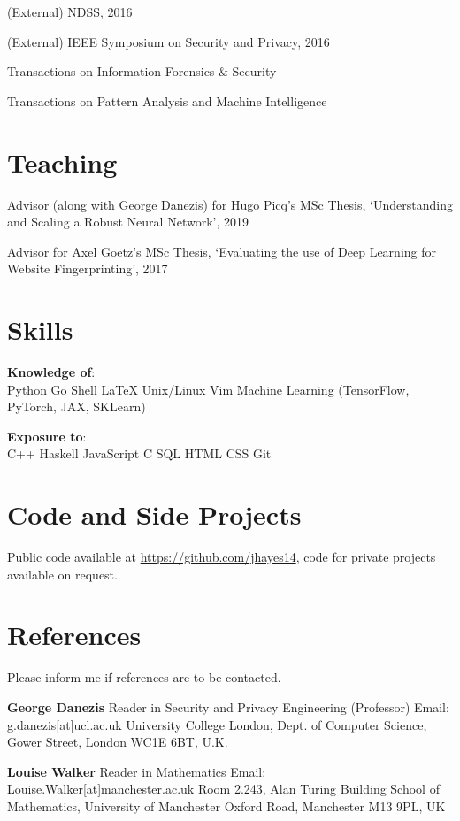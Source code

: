 \documentclass[margin,line]{res}
\begin{document}
\begin{resume}
(External) NDSS, 2016

(External) IEEE Symposium on Security and Privacy, 2016

Transactions on Information Forensics \& Security

Transactions on Pattern Analysis and Machine Intelligence

\section{\sc Teaching}

Advisor (along with George Danezis) for Hugo Picq's MSc Thesis, `Understanding and Scaling a Robust Neural Network', 2019

Advisor for Axel Goetz's MSc Thesis, `Evaluating the use of Deep Learning for Website Fingerprinting', 2017


\section{\sc Skills} 
\textbf{Knowledge of}:\\
Python \textbullet{} Go \textbullet{} Shell \textbullet{} \LaTeX \textbullet{}
Unix/Linux \textbullet{} Vim \textbullet{} Machine Learning
(TensorFlow, PyTorch, JAX, SKLearn)  

\textbf{Exposure to}:\\
C++ \textbullet{} Haskell \textbullet{} JavaScript \textbullet{} C \textbullet{} SQL \textbullet{} HTML
\textbullet{} CSS \textbullet{} Git

\section{\sc Code and Side Projects}

Public code available at \url{https://github.com/jhayes14}, code for
private projects available on request. 

\section{\sc References} 

Please inform me if references are to be contacted.

\textbf{George Danezis}\newline
Reader in Security and Privacy Engineering (Professor) \newline
Email: g.danezis[at]ucl.ac.uk \newline
University College London,\newline
Dept. of Computer Science,\newline
Gower Street, London WC1E 6BT, U.K. \newline

\textbf{Louise Walker}\newline
Reader in Mathematics \newline
Email: Louise.Walker[at]manchester.ac.uk \newline
Room 2.243, Alan Turing Building \newline
School of Mathematics,\newline
University of Manchester \newline
Oxford Road, Manchester M13 9PL, UK \newline


\end{resume}
\end{document}
